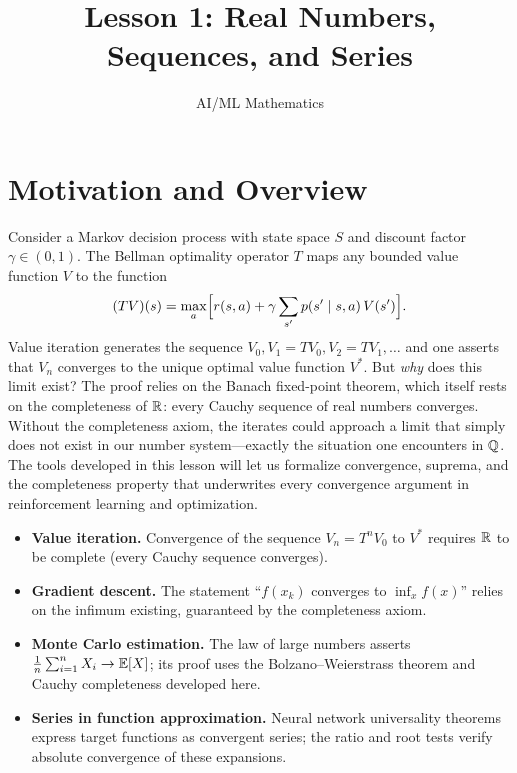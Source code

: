 \documentclass[11pt,a4paper]{article}
\title{Lesson 1: Real Numbers, Sequences, and Series}
\author{AI/ML Mathematics}
\date{}
\begin{document}
\maketitle
\tableofcontents
\newpage

\section{Motivation and Overview}
\label{sec:motivation}

Consider a Markov decision process with state space $S$ and discount factor
$\gamma \in (0,1)$. The Bellman optimality operator $T$ maps any bounded
value function $V$ to the function
\[
  (TV)(s) = \max_{a} \Bigl[ r(s,a)
    + \gamma \sum_{s'} p(s' \mid s,a)\, V(s') \Bigr].
\]
Value iteration generates the sequence $V_0, V_1 = TV_0, V_2 = TV_1, \ldots$
and one asserts that $V_n$ converges to the unique optimal value function
$V^*$. But \emph{why} does this limit exist? The proof relies on the Banach
fixed-point theorem, which itself rests on the completeness of $\mathbb{R}$: every
Cauchy sequence of real numbers converges. Without the completeness axiom,
the iterates could approach a limit that simply does not exist in our number
system---exactly the situation one encounters in $\mathbb{Q}$. The tools developed in
this lesson will let us formalize convergence, suprema, and the completeness
property that underwrites every convergence argument in reinforcement
learning and optimization.

\begin{rlconnection}[title={Why RL/ML needs the real number system}]
\begin{itemize}[nosep]
  \item \textbf{Value iteration.} Convergence of the sequence $V_n = T^n V_0$
    to $V^*$ requires $\mathbb{R}$ to be complete (every Cauchy sequence converges).
  \item \textbf{Gradient descent.} The statement ``$f(x_k)$ converges to
    $\inf_x f(x)$'' relies on the infimum existing, guaranteed by the
    completeness axiom.
  \item \textbf{Monte Carlo estimation.} The law of large numbers asserts
    $\frac{1}{n}\sum_{i=1}^n X_i \to \mathbb{E}[X]$; its proof uses the
    Bolzano--Weierstrass theorem and Cauchy completeness developed here.
  \item \textbf{Series in function approximation.} Neural network
    universality theorems express target functions as convergent series;
    the ratio and root tests verify absolute convergence of these
    expansions.
\end{itemize}
\end{rlconnection}
\end{document}
